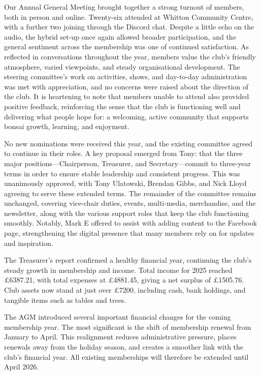 \label{2025-11-agm-summary}

\noindent
Our Annual General Meeting brought together a strong turnout of members, both in person and online. Twenty-six attended at Whitton Community Centre, with a further two joining through the Discord chat. Despite a little echo on the audio, the hybrid set-up once again allowed broader participation, and the general sentiment across the membership was one of continued satisfaction. As reflected in conversations throughout the year, members value the club's friendly atmosphere, varied viewpoints, and steady organisational development. The steering committee’s work on activities, shows, and day-to-day administration was met with appreciation, and no concerns were raised about the direction of the club. It is heartening to note that members unable to attend also provided positive feedback, reinforcing the sense that the club is functioning well and delivering what people hope for: a welcoming, active community that supports bonsai growth, learning, and enjoyment.

\medskip
{}
\noindent
No new nominations were received this year, and the existing committee agreed to continue in their roles. A key proposal emerged from Tony: that the three major positions---Chairperson, Treasurer, and Secretary---commit to three-year terms in order to ensure stable leadership and consistent progress. This was unanimously approved, with Tony Ulatowski, Brendan Gibbs, and Nick Lloyd agreeing to serve these extended terms.
%
The remainder of the committee remains unchanged, covering vice-chair duties, events, multi-media, merchandise, and the newsletter, along with the various support roles that keep the club functioning smoothly. Notably, Mark E offered to assist with adding content to the Facebook page, strengthening the digital presence that many members rely on for updates and inspiration.

\medskip
{}
\noindent
The Treasurer’s report confirmed a healthy financial year, continuing the club’s steady growth in membership and income. Total income for 2025 reached £6387.21, with total expenses at £4881.45, giving a net surplus of £1505.76. Club assets now stand at just over £7200, including cash, bank holdings, and tangible items such as tables and trees.

The AGM introduced several important financial changes for the coming membership year. The most significant is the shift of membership renewal from January to April. This realignment reduces administrative pressure, places renewals away from the holiday season, and creates a smoother link with the club’s financial year. All existing memberships will therefore be extended until April 2026.

